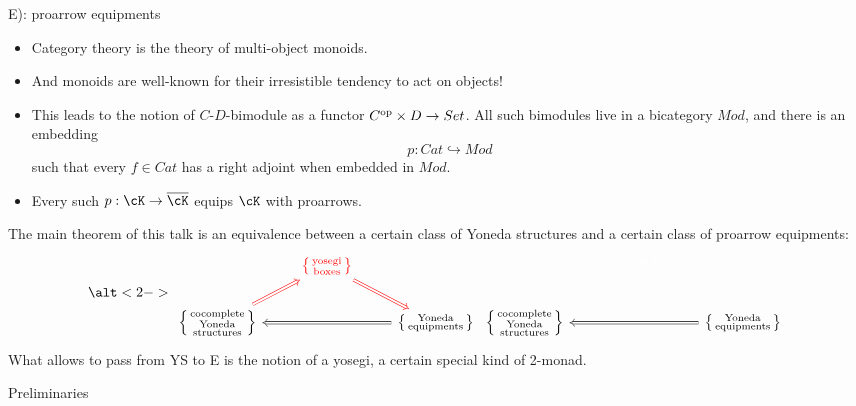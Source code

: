 \documentclass{beamer}
\begin{document}
\begin{frame}
	\begin{block}{E): proarrow equipments}
		\begin{itemize}
			\item<1-> Category theory is the theory of multi-object monoids.
			\item<2-> And monoids are well-known for their irresistible tendency to act on objects!
			\item<3-> This leads to the notion of \alert{$C$-$D$-bimodule} as a functor $C^{\text{op}}\times D\to Set$. All such bimodules live in a bicategory $Mod$, and there is an embedding \[p : Cat \hookrightarrow Mod\] such that every $f\in Cat$ has a right adjoint when embedded in $Mod$.
			\item<4-> Every such $p : \cK \to \overline{\cK}$ \alert{equips $\cK$ with proarrows}.
		\end{itemize}
	\end{block}
\end{frame}
\begin{frame}
	The main theorem of this talk is an equivalence between a certain class of Yoneda structures and a certain class of proarrow equipments:
	\[
		\notag
		\alt<2->{\begin{tikzcd}[ampersand replacement=\&]
				\& {\color{red} \yose} \arrow[Rightarrow,rd,red] \&  \\
				{\yone} \arrow[Rightarrow,ru,red] \&  \& {\equ} \arrow[Rightarrow,ll]
			\end{tikzcd}}{\begin{tikzcd}[ampersand replacement=\&]
				\& {\color{white} \yose}  \&  \\
				{\yone} \&  \& {\equ} \arrow[Rightarrow,ll]
			\end{tikzcd}}
	\]
	\onslide<3->
	What allows to pass from YS to E is the notion of a \alert{yosegi}, a certain special kind of 2-monad.
\end{frame}
\begin{frame}
	\Huge \centering Preliminaries
\end{frame}
\end{document}
